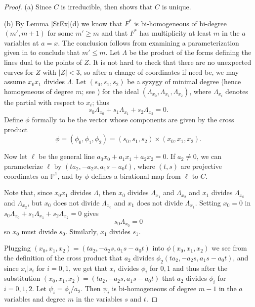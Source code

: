 \documentclass[12pt]{amsart}
\numberwithin{equation}{section}
\theoremstyle{definition}
\newcommand{\PP}{ \ensuremath{\mathbb{P}}}
\begin{document}
\begin{proof}
(a) Since $C$ is irreducible, then \cite{CHMN} shows that $C$ is unique.

(b) By Lemma \ref{StEx}(d) we know that $F^*$ is bi-homogeneous of bi-degree $(m',m+1)$
for some $m'\geq m$ and that $F^*$ has multiplicity at least $m$ in the $a$ variables at $a=x$.
The conclusion follows from examining a parameterization given in \cite{CHMN} to conclude that $m'\leq m$.
Let $\Lambda$ be the product of the forms defining the lines dual to the points of $Z$.
It is not hard to check that there are no unexpected curves for $Z$ with $|Z|<3$, so
after a change of coordinates if need be, we may assume $x_0x_1$ divides $\Lambda$.
Let $(s_0,s_1,s_2)$ be a syzygy of minimal degree (hence homogeneous of degree $m$;
see \cite{CHMN}) for the ideal $(\Lambda_{x_0},\Lambda_{x_1},\Lambda_{x_2})$,
where $\Lambda_{x_i}$ denotes the partial with respect to $x_i$; thus
$$s_0\Lambda_{x_0}+s_1\Lambda_{x_1}+s_2\Lambda_{x_2}=0.$$
Define $\phi$ formally to be the vector whose components are given by the cross
product 
$$\phi=(\phi_0,\phi_1,\phi_2)=(s_0,s_1,s_2)\times (x_0,x_1,x_2).$$

Now let $\ell$ be the general line $a_0x_0+a_1x_1+a_2x_2=0$.
If $a_2\neq0$, we can parameterize $\ell$ by $(ta_2,-a_2s,a_1s-a_0t)$,
where $(t,s)$ are projective coordinates on $\PP^1$,
and by \cite{CHMN} $\phi$ defines a birational map from $\ell$ to $C$.

Note that, since $x_0x_1$ divides $\Lambda$, then $x_0$ divides $\Lambda_{x_1}$ and
$\Lambda_{x_2}$ and $x_1$ divides $\Lambda_{x_0}$ and $\Lambda_{x_2}$, but
$x_0$ does not divide $\Lambda_{x_0}$ and $x_1$ does not divide $\Lambda_{x_1}$.
Setting $x_0=0$ in $s_0\Lambda_{x_0}+s_1\Lambda_{x_1}+s_2\Lambda_{x_2}=0$ gives
$$s_0\Lambda_{x_0}=0$$
so $x_0$ must divide $s_0$. Similarly, $x_1$ divides $s_1$.

Plugging $(x_0,x_1,x_2)=(ta_2,-a_2s,a_1s-a_0t)$ into $\phi(x_0,x_1,x_2)$ we see from the definition of the cross product
that $a_2$ divides $\phi_2(ta_2,-a_2s,a_1s-a_0t)$, and since $x_i|s_i$ for $i=0,1$, we get that 
$x_i$ divides $\phi_i$ for $0,1$ and thus after the substitution $(x_0,x_1,x_2)=(ta_2,-a_2s,a_1s-a_0t)$ 
that $a_2$ divides $\phi_i$ for $i=0,1,2$. Let $\psi_i=\phi_i/a_2$. Then
$\psi_i$ is bi-homogeneous of degree $m-1$ in the $a$ variables and degree $m$ in the
variables $s$ and $t$.


\end{proof}
\end{document}

